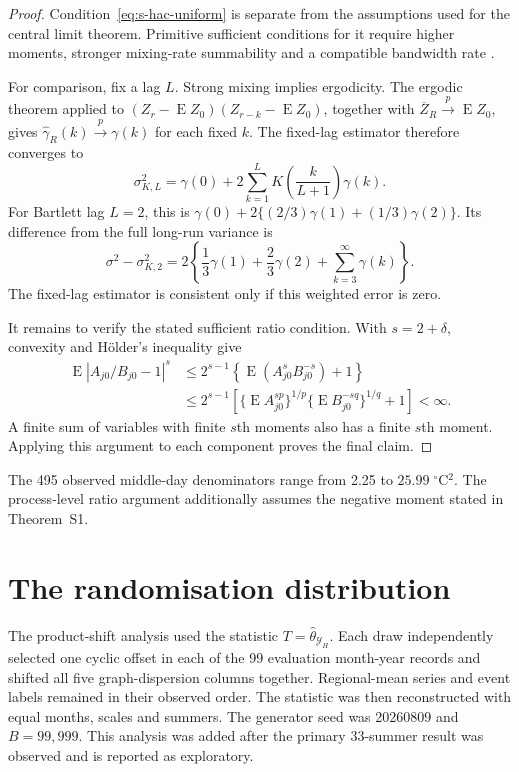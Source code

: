 \documentclass[namedate,webpdf,modern,mediumone]{oup-authoring-template}
\theoremstyle{thmstyleone}
\begin{document}
\begin{proof}
Condition~\eqref{eq:s-hac-uniform} is separate from the assumptions used for
the central limit theorem. Primitive sufficient conditions for it require
higher moments, stronger mixing-rate summability and a compatible bandwidth
rate 
\citep{andrews1991,newey1987}.

For comparison, fix a lag $L$. Strong mixing implies ergodicity. The ergodic
theorem applied to
$(Z_r-\operatorname EZ_0)(Z_{r-k}-\operatorname EZ_0)$, together with
$\overline Z_R\overset p\longrightarrow\operatorname EZ_0$, gives
$\widehat\gamma_R(k)\overset p\longrightarrow\gamma(k)$ for each fixed
$k$. The fixed-lag estimator therefore converges to
\begin{equation}
 \sigma_{K,L}^2=\gamma(0)+2\sum_{k=1}^{L}
 K\left(\frac{k}{L+1}\right)\gamma(k).
 \label{eq:s-fixed-lag-limit}
\end{equation}
For Bartlett lag $L=2$, this is
$\gamma(0)+2\{(2/3)\gamma(1)+(1/3)\gamma(2)\}$. Its difference from the
full long-run variance is
\[
 \sigma^2-\sigma_{K,2}^2
 =2\left\{\frac{1}{3}\gamma(1)+\frac{2}{3}\gamma(2)
      +\sum_{k=3}^{\infty}\gamma(k)\right\}.
\]
The fixed-lag estimator is consistent only if this weighted error is zero.

It remains to verify the stated sufficient ratio condition. With
$s=2+\delta$, convexity and H\"older's inequality give
\begin{align*}
 \operatorname E|A_{j0}/B_{j0}-1|^s
 &\leq 2^{s-1}\left\{
    \operatorname E(A_{j0}^sB_{j0}^{-s})+1\right\} \\
 &\leq 2^{s-1}\left[
   \{\operatorname EA_{j0}^{sp}\}^{1/p}
   \{\operatorname EB_{j0}^{-sq}\}^{1/q}+1\right]<\infty.
\end{align*}
A finite sum of variables with finite $s$th moments also has a finite $s$th
moment. Applying this argument to each component proves the final claim.
\end{proof}

The 495 observed middle-day denominators range from 2.25 to
$25.99\;{}^\circ$C$^2$. The process-level ratio argument additionally assumes
the negative moment stated in Theorem~S1.

\section{The randomisation distribution}
\label{sec:global-shift}

The product-shift analysis used the statistic
$T=\widehat\theta_{\mathcal Y_H}$. Each draw independently selected one
cyclic offset in each of the 99 evaluation month-year records and shifted all
five graph-dispersion columns together. Regional-mean series and event labels
remained in their observed order. The statistic was then reconstructed with
equal months, scales and summers. The generator seed was 20260809 and
$B=99{,}999$. This analysis was added after the primary 33-summer result was
observed and is reported as exploratory.
\end{document}
